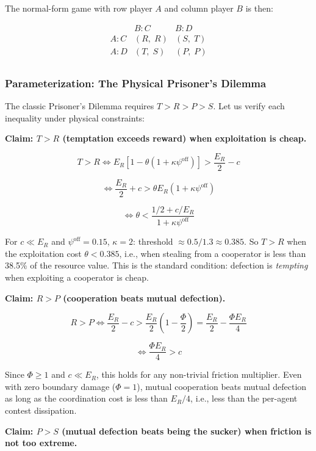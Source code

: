 \documentclass[11pt]{article}
\theoremstyle{plain}
\theoremstyle{definition}
\theoremstyle{remark}
\let\origsubsubsection\subsubsection
\renewcommand{\subsubsection}{\needspace{4\baselineskip}\origsubsubsection}
\begin{document}
The normal-form game with row player \(A\) and column player \(B\) is
then:

\[\begin{array}{c|c|c}
 & B: C & B: D \\ \hline
A: C & (R,\; R) & (S,\; T) \\ \hline
A: D & (T,\; S) & (P,\; P) \\
\end{array}\]

\subsubsection{Parameterization: The Physical Prisoner's
Dilemma}\label{parameterization-the-physical-prisoners-dilemma}

The classic Prisoner's Dilemma requires \(T > R > P > S\). Let us verify
each inequality under physical constraints:

\textbf{Claim: \(T > R\) (temptation exceeds reward) when exploitation
is cheap.}

\[T > R \iff E_R[1 - \theta(1 + \kappa\psi^{\text{off}})] > \frac{E_R}{2} - c\]

\[\iff \frac{E_R}{2} + c > \theta E_R(1 + \kappa\psi^{\text{off}})\]

\[\iff \theta < \frac{1/2 + c/E_R}{1 + \kappa\psi^{\text{off}}}\]

For \(c \ll E_R\) and \(\psi^{\text{off}} = 0.15\), \(\kappa = 2\):
threshold \(\approx 0.5/1.3 \approx 0.385\). So \(T > R\) when the
exploitation cost \(\theta < 0.385\), i.e., when stealing from a
cooperator is less than 38.5\% of the resource value. This is the
standard condition: defection is \emph{tempting} when exploiting a
cooperator is cheap.

\textbf{Claim: \(R > P\) (cooperation beats mutual defection).}

\[R > P \iff \frac{E_R}{2} - c > \frac{E_R}{2}\left(1 - \frac{\Phi}{2}\right) = \frac{E_R}{2} - \frac{\Phi E_R}{4}\]

\[\iff \frac{\Phi E_R}{4} > c\]

Since \(\Phi \geq 1\) and \(c \ll E_R\), this holds for any non-trivial
friction multiplier. Even with zero boundary damage (\(\Phi = 1\)),
mutual cooperation beats mutual defection as long as the coordination
cost is less than \(E_R/4\), i.e., less than the per-agent contest
dissipation.

\textbf{Claim: \(P > S\) (mutual defection beats being the sucker) when
friction is not too extreme.}
\end{document}
